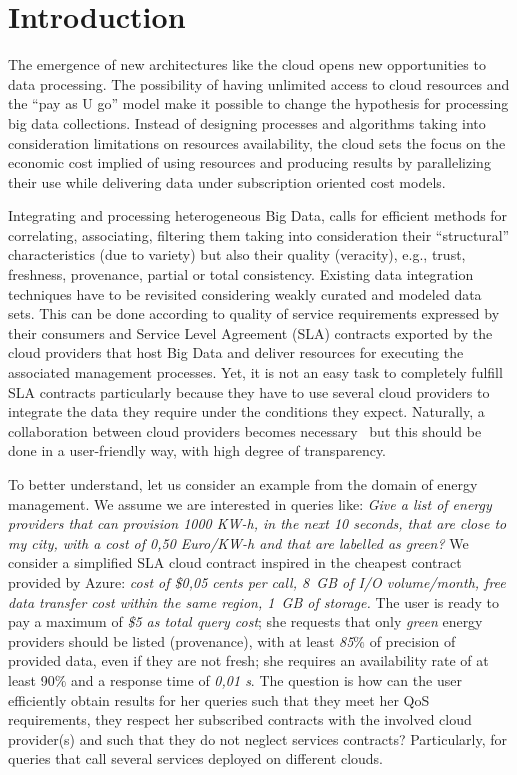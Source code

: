 \section{Introduction}
\label{sec:intro}

The emergence of new architectures like the cloud opens new opportunities to data processing. 
The possibility of having unlimited access to cloud resources and the ``pay as U go'' model make it possible to change the hypothesis for processing big  data collections.  Instead of designing processes and algorithms taking into consideration  limitations on resources availability, the cloud sets the focus on the economic cost implied of using resources and producing results by parallelizing their use while delivering data under subscription oriented cost models.
 
Integrating and processing heterogeneous Big Data, calls for efficient methods for correlating, associating, filtering them taking into consideration their ``structural'' characteristics (due to variety) but also their quality (veracity), e.g., trust, freshness, provenance, partial or total consistency. 
Existing data integration techniques have to be revisited considering weakly curated and modeled data sets. This can be done according to quality of service requirements expressed by their consumers and Service Level Agreement (SLA) contracts exported by the cloud providers that host  Big Data and deliver resources for executing the associated management processes. Yet, it is not an easy task to completely fulfill   SLA contracts particularly because they have to use several cloud providers to integrate the data they require under the conditions they expect.
Naturally, a collaboration between cloud providers becomes necessary~\cite{036} but this should be done in a user-friendly way, with high degree of transparency. 

To better understand, let us consider an example from the domain of energy
management. We assume we are interested in queries like: \textit{Give a list
of energy providers that can provision 1000 KW-h, in the next 10 seconds, that are close to my city, with a cost of 0,50 Euro/KW-h and that are labelled as green?} We consider a simplified SLA cloud contract inspired in the cheapest contract provided by Azure: \textit{cost of \$0,05 cents per call,  8~GB of I/O volume/month, free data transfer cost within the same region,  1~GB of storage.} 
The user is ready to pay a maximum of \textit{\$5 as total query cost}; she requests that only  \textit{green} energy providers should be  listed (provenance), with at least  \textit{85$\%$} of precision of provided data, even if they are not fresh; she requires an availability rate of at least 90$\%$ and a response time of  \textit{0,01 s}. 
  The question is how can the user efficiently obtain  results for her queries such that they meet her QoS requirements, they respect her subscribed contracts with the involved cloud provider(s) and such that they do not neglect services contracts? Particularly, for queries that call several services deployed  on different clouds.

